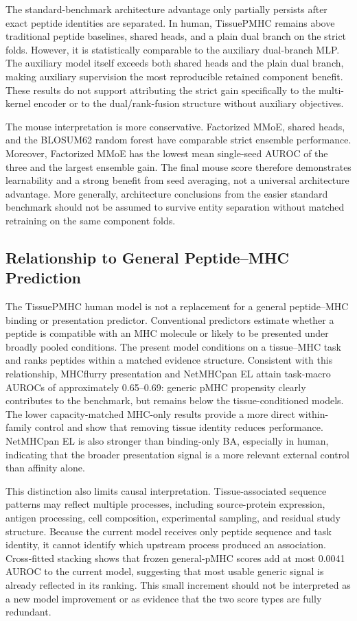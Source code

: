 The standard-benchmark architecture advantage only partially persists after exact peptide identities are separated. In human, TissuePMHC remains above traditional peptide baselines, shared heads, and a plain dual branch on the strict folds. However, it is statistically comparable to the auxiliary dual-branch MLP. The auxiliary model itself exceeds both shared heads and the plain dual branch, making auxiliary supervision the most reproducible retained component benefit. These results do not support attributing the strict gain specifically to the multi-kernel encoder or to the dual/rank-fusion structure without auxiliary objectives.

The mouse interpretation is more conservative. Factorized MMoE, shared heads, and the BLOSUM62 random forest have comparable strict ensemble performance. Moreover, Factorized MMoE has the lowest mean single-seed AUROC of the three and the largest ensemble gain. The final mouse score therefore demonstrates learnability and a strong benefit from seed averaging, not a universal architecture advantage. More generally, architecture conclusions from the easier standard benchmark should not be assumed to survive entity separation without matched retraining on the same component folds.

\subsection{Relationship to General Peptide--MHC Prediction}

The TissuePMHC human model is not a replacement for a general peptide--MHC binding or presentation predictor. Conventional predictors estimate whether a peptide is compatible with an MHC molecule or likely to be presented under broadly pooled conditions. The present model conditions on a tissue--MHC task and ranks peptides within a matched evidence structure. Consistent with this relationship, MHCflurry presentation and NetMHCpan EL attain task-macro AUROCs of approximately 0.65--0.69: generic pMHC propensity clearly contributes to the benchmark, but remains below the tissue-conditioned models. The lower capacity-matched MHC-only results provide a more direct within-family control and show that removing tissue identity reduces performance. NetMHCpan EL is also stronger than binding-only BA, especially in human, indicating that the broader presentation signal is a more relevant external control than affinity alone.

This distinction also limits causal interpretation. Tissue-associated sequence patterns may reflect multiple processes, including source-protein expression, antigen processing, cell composition, experimental sampling, and residual study structure. Because the current model receives only peptide sequence and task identity, it cannot identify which upstream process produced an association. Cross-fitted stacking shows that frozen general-pMHC scores add at most 0.0041 AUROC to the current model, suggesting that most usable generic signal is already reflected in its ranking. This small increment should not be interpreted as a new model improvement or as evidence that the two score types are fully redundant.

